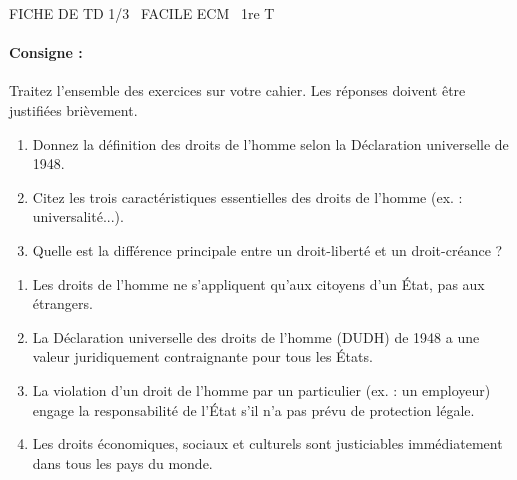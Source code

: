 \documentclass[11pt]{article}
\begin{document}
\begin{tcolorbox}[enhanced,colback=popink,colframe=popink,arc=10pt,boxrule=0pt,left=12pt,right=12pt,top=9pt,bottom=9pt]
{\color{white}\popxbold\small FICHE DE TD 1/3 \textbullet\ FACILE \hfill ECM \textbullet\ 1re T\par}
\end{tcolorbox}
\vspace{4pt}
\paragraph{Consigne :} Traitez l'ensemble des exercices sur votre cahier. Les réponses doivent être justifiées brièvement.

\begin{exercice}
\begin{enumerate}
    \item Donnez la définition des droits de l'homme selon la Déclaration universelle de 1948.
    \item Citez les trois caractéristiques essentielles des droits de l'homme (ex. : universalité...).
    \item Quelle est la différence principale entre un droit-liberté et un droit-créance ?
\end{enumerate}
\end{exercice}

\begin{exercice}
\begin{enumerate}
    \item Les droits de l'homme ne s'appliquent qu'aux citoyens d'un État, pas aux étrangers.
    \item La Déclaration universelle des droits de l'homme (DUDH) de 1948 a une valeur juridiquement contraignante pour tous les États.
    \item La violation d'un droit de l'homme par un particulier (ex. : un employeur) engage la responsabilité de l'État s'il n'a pas prévu de protection légale.
    \item Les droits économiques, sociaux et culturels sont justiciables immédiatement dans tous les pays du monde.
\end{enumerate}
\end{exercice}
\end{document}

